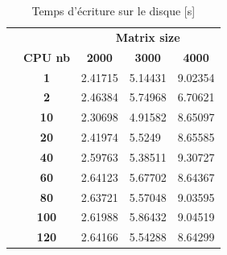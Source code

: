 \documentclass[12pt,a4paper,oneside, titlepage]{report}
\begin{document}
\begin{table}[H]
\begin{tabular}{lc|l|l|l|}
\cline{3-5}
                      & \multicolumn{1}{l|}{} & \multicolumn{3}{c|}{\textbf{Matrix size}}                                                                    \\ \cline{2-5}
\multicolumn{1}{l|}{} & \textbf{CPU nb}       & \multicolumn{1}{c|}{\textbf{2000}} & \multicolumn{1}{c|}{\textbf{3000}} & \multicolumn{1}{c|}{\textbf{4000}} \\ \cline{2-5}
\multicolumn{1}{l|}{} & \textbf{1}            & 2.41715                            & 5.14431                            & 9.02354                            \\ \cline{2-5}
\multicolumn{1}{l|}{} & \textbf{2}            & 2.46384                            & 5.74968                            & 6.70621                            \\ \cline{2-5}
\multicolumn{1}{l|}{} & \textbf{10}           & 2.30698                            & 4.91582                            & 8.65097                            \\ \cline{2-5}
\multicolumn{1}{l|}{} & \textbf{20}           & 2.41974                            & 5.5249                             & 8.65585                            \\ \cline{2-5}
\multicolumn{1}{l|}{} & \textbf{40}           & 2.59763                            & 5.38511                            & 9.30727                            \\ \cline{2-5}
\multicolumn{1}{l|}{} & \textbf{60}           & 2.64123                            & 5.67702                            & 8.64367                            \\ \cline{2-5}
\multicolumn{1}{l|}{} & \textbf{80}           & 2.63721                            & 5.57048                            & 9.03595                            \\ \cline{2-5}
\multicolumn{1}{l|}{} & \textbf{100}          & 2.61988                            & 5.86432                            & 9.04519                            \\ \cline{2-5}
\multicolumn{1}{l|}{} & \textbf{120}          & 2.64166                            & 5.54288                            & 8.64299                            \\ \cline{2-5}
\end{tabular}
\caption{Temps d'écriture sur le disque [s]}
\end{table}
\end{document}
